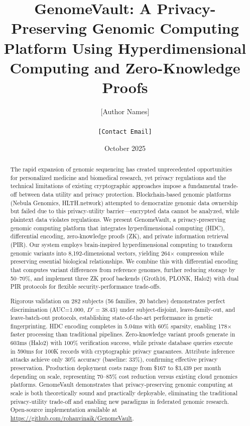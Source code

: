 \documentclass[11pt,letterpaper]{article}
\title{\textbf{GenomeVault: A Privacy-Preserving Genomic Computing Platform Using Hyperdimensional Computing and Zero-Knowledge Proofs}}
\author{
    [Author Names]\\
    [Institution Names]\\
    \texttt{[Contact Email]}
}
\date{October 2025}
\begin{document}
\maketitle

\begin{abstract}
The rapid expansion of genomic sequencing has created unprecedented opportunities for personalized medicine and biomedical research, yet privacy regulations and the technical limitations of existing cryptographic approaches impose a fundamental trade-off between data utility and privacy protection. Blockchain-based genomic platforms (Nebula Genomics, HLTH.network) attempted to democratize genomic data ownership but failed due to this privacy-utility barrier---encrypted data cannot be analyzed, while plaintext data violates regulations. We present GenomeVault, a privacy-preserving genomic computing platform that integrates hyperdimensional computing (HDC), differential encoding, zero-knowledge proofs (ZK), and private information retrieval (PIR). Our system employs brain-inspired hyperdimensional computing to transform genomic variants into 8,192-dimensional vectors, yielding 264$\times$ compression while preserving essential biological relationships. We combine this with differential encoding that computes variant differences from reference genomes, further reducing storage by 50--70\%, and implement three ZK proof backends (Groth16, PLONK, Halo2) with dual PIR protocols for flexible security-performance trade-offs.

Rigorous validation on 282 subjects (56 families, 20 batches) demonstrates perfect discrimination (AUC=1.000, $D'=38.43$) under subject-disjoint, leave-family-out, and leave-batch-out protocols, establishing state-of-the-art performance in genetic fingerprinting. HDC encoding completes in 5.04ms with 60\% sparsity, enabling 178$\times$ faster processing than traditional pipelines. Zero-knowledge variant proofs generate in 603ms (Halo2) with 100\% verification success, while private database queries execute in 590ms for 100K records with cryptographic privacy guarantees. Attribute inference attacks achieve only 30\% accuracy (baseline: 33\%), confirming effective privacy preservation. Production deployment costs range from \$167 to \$3,439 per month depending on scale, representing 70--85\% cost reduction versus existing cloud genomics platforms. GenomeVault demonstrates that privacy-preserving genomic computing at scale is both theoretically sound and practically deployable, eliminating the traditional privacy-utility trade-off and enabling new paradigms in federated genomic research. Open-source implementation available at \url{https://github.com/rohanvinaik/GenomeVault}.
\end{abstract}
\end{document}
